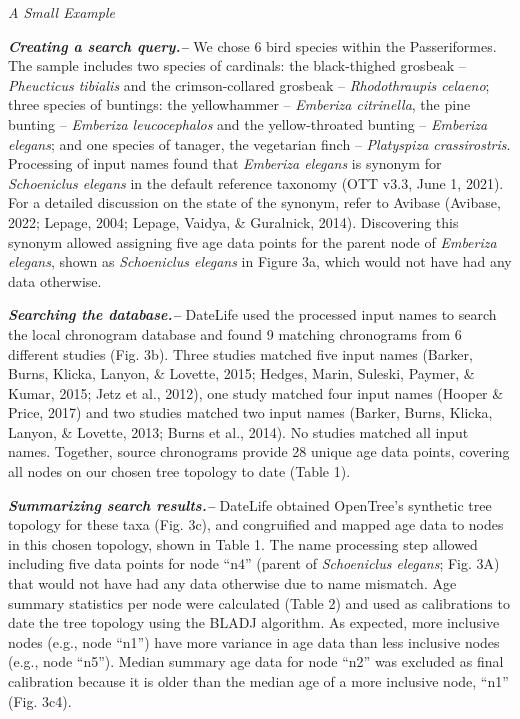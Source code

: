 \documentclass[english,man]{apa6}
\begin{document}
\begin{center}
\emph{A Small Example}
\end{center}

\textbf{\emph{Creating a search query.--}}
We chose 6 bird species within the Passeriformes. The sample includes
two species of cardinals:
the black-thighed grosbeak -- \emph{Pheucticus tibialis} and
the crimson-collared grosbeak -- \emph{Rhodothraupis celaeno};
three species of buntings:
the yellowhammer -- \emph{Emberiza citrinella},
the pine bunting -- \emph{Emberiza leucocephalos} and
the yellow-throated bunting -- \emph{Emberiza elegans};
and one species of tanager, the vegetarian finch -- \emph{Platyspiza crassirostris}.
Processing of input names found that \emph{Emberiza elegans} is synonym for \emph{Schoeniclus elegans} in the default reference taxonomy (OTT v3.3, June 1, 2021). For a detailed discussion on the state of the synonym, refer to Avibase (Avibase, 2022; Lepage, 2004; Lepage, Vaidya, \& Guralnick, 2014).
Discovering this synonym allowed assigning five age data points for the parent node of \emph{Emberiza elegans}, shown as \emph{Schoeniclus elegans} in Figure 3a, which would not have had any data otherwise.

\textbf{\emph{Searching the database.--}}
DateLife used the processed input names to search the local chronogram database and found 9 matching chronograms from 6 different studies (Fig. 3b). Three studies matched five input names (Barker, Burns, Klicka, Lanyon, \& Lovette, 2015; Hedges, Marin, Suleski, Paymer, \& Kumar, 2015; Jetz et al., 2012), one study matched four input names (Hooper \& Price, 2017) and two studies matched two input names (Barker, Burns, Klicka, Lanyon, \& Lovette, 2013; Burns et al., 2014). No studies matched all input names. Together, source chronograms provide 28 unique age data points, covering all nodes on our chosen tree topology to date (Table 1).

\textbf{\emph{Summarizing search results.--}}
DateLife obtained OpenTree's synthetic tree topology for these taxa (Fig. 3c), and congruified and mapped age data to nodes in this chosen topology, shown in Table 1.
The name processing step allowed including five data points for node \enquote{n4} (parent of \emph{Schoeniclus elegans}; Fig. 3A) that would not have had any data otherwise due to name mismatch.
Age summary statistics per node were calculated (Table 2) and used as calibrations to date the tree topology using the BLADJ algorithm.
As expected, more inclusive nodes (e.g., node \enquote{n1}) have more variance in age data than less inclusive nodes (e.g., node \enquote{n5}).
Median summary age data for node \enquote{n2} was excluded as final calibration because it is older than the median age of a more inclusive node, \enquote{n1} (Fig. 3c4).
\end{document}
